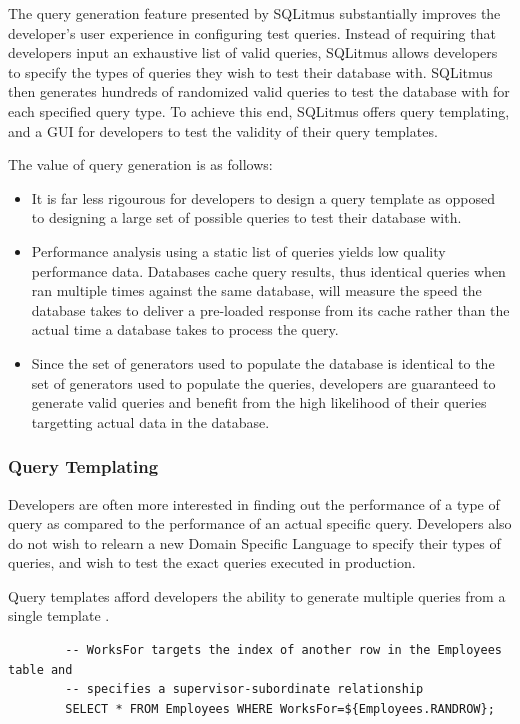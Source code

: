 \documentclass[12pt]{article}
\begin{document}
\begin{spacing}{1.9}
		The query generation feature presented by SQLitmus substantially improves the developer's user experience in configuring test queries. Instead of requiring that developers input an exhaustive list of valid queries, SQLitmus allows developers to specify the types of queries they wish to test their database with. SQLitmus then generates hundreds of randomized valid queries to test the database with for each specified query type. To achieve this end, SQLitmus offers query templating, and a GUI for developers to test the validity of their query templates.
		
		The value of query generation is as follows:
		\begin{itemize}
			\item It is far less rigourous for developers to design a query template as opposed to designing a large set of possible queries to test their database with.
			\item Performance analysis using a static list of queries yields low quality performance data. Databases cache query results, thus identical queries when ran multiple times against the same database, will measure the speed the database takes to deliver a pre-loaded response from its cache rather than the actual time a database takes to process the query.
			\item Since the set of generators used to populate the database is identical to the set of generators used to populate the queries, developers are guaranteed to generate valid queries and benefit from the high likelihood of their queries targetting actual data in the database.
		\end{itemize}
		
		\subsubsection{Query Templating}
		
		Developers are often more interested in finding out the performance of a type of query as compared to the performance of an actual specific query. Developers also do not wish to relearn a new Domain Specific Language to specify their types of queries, and wish to test the exact queries executed in production.
		
		Query templates afford developers the ability to generate multiple queries from a single template . 
		
		
		
		\begin{verbatim}
		-- WorksFor targets the index of another row in the Employees table and
		-- specifies a supervisor-subordinate relationship
		SELECT * FROM Employees WHERE WorksFor=${Employees.RANDROW};
		\end{verbatim}
		

\end{spacing}
\end{document}
